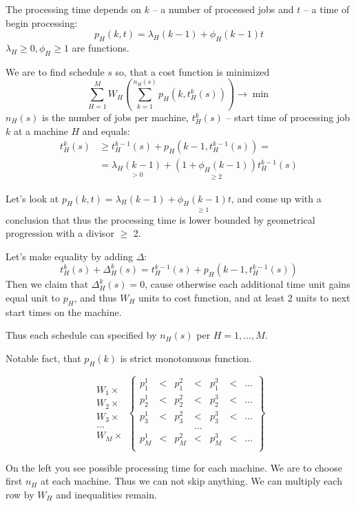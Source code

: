 \documentclass{amsart}
\begin{document}
The processing time depends on $k$ -- a number of processed jobs and
$t$ -- a time of begin processing:
\[
  p_H(k,t) = \lambda_H(k-1) + \phi_H(k-1)t
\]
$\lambda_H \geqslant 0, \phi_H \geqslant 1$ are functions.

We are to find schedule $s$ so, that a cost function is minimized
\[
  \sum_{H=1}^M W_H
    \left(
      \sum_{k=1}^{n_H(s)} p_H(k,t_H^k(s))
    \right) \to \min
\]
$n_H(s)$ is the number of jobs per machine,
$t_H^k(s)$ -- start time of processing job $k$ at a machine $H$ and
equals:
\begin{align*}
  t_H^k(s)
    & \geqslant t_H^{k-1}(s) + p_H(k-1, t_H^{k-1}(s)) = \\
    & = \underset{>0}{\lambda_H(k-1)} +
      \underset{\geqslant 2}{(1 + \phi_H(k-1))}t_H^{k-1}(s) 
\end{align*}

Let's look at
$p_H(k,t) = \lambda_H(k-1) + \underset{\geqslant 1}{\phi_H(k-1)}t$,
and come up with a conclusion
that thus the processing time
is lower bounded by geometrical progression with a divisor $\geqslant$ 2.

Let's make equality by adding $\Delta$:
\[
  t_H^k(s) + \Delta_H^k(s) =
  t_H^{k-1}(s) + p_H(k-1, t_H^{k-1}(s))
\]
Then we claim that $\Delta_H^k(s) = 0$, cause otherwise each additional
time unit gains equal unit to $p_H$, and thus $W_H$ units to cost
function, and at least 2 units to next start times on the machine.

Thus each schedule can specified by $n_H(s)$ per $H=1,\dots,M$.

Notable fact, that $p_H(k)$ is strict monotonuous function.

\begin{multicols}{2}
\[
  \begin{matrix}
    W_1 \times \\
    W_2 \times \\
    W_3 \times \\
    \dots \\
    W_M \times
  \end{matrix}
  \left\{
    \begin{matrix}
      p_1^1 & < & p_1^2 & < & p_1^3 & < & \dots \\
      p_2^1 & < & p_2^2 & < & p_2^3 & < & \dots \\
      p_3^1 & < & p_3^2 & < & p_3^3 & < & \dots \\
      & & & \dots \\
      p_M^1 & < & p_M^2 & < & p_M^3 & < & \dots \\
    \end{matrix}
  \right\}
\]

\hfill

On the left you see possible processing time for each machine.
We are to choose first $n_H$ at each machine.
Thus we can not skip anything. We can multiply each row by $W_H$
and inequalities remain.
\end{multicols}
\end{document}

